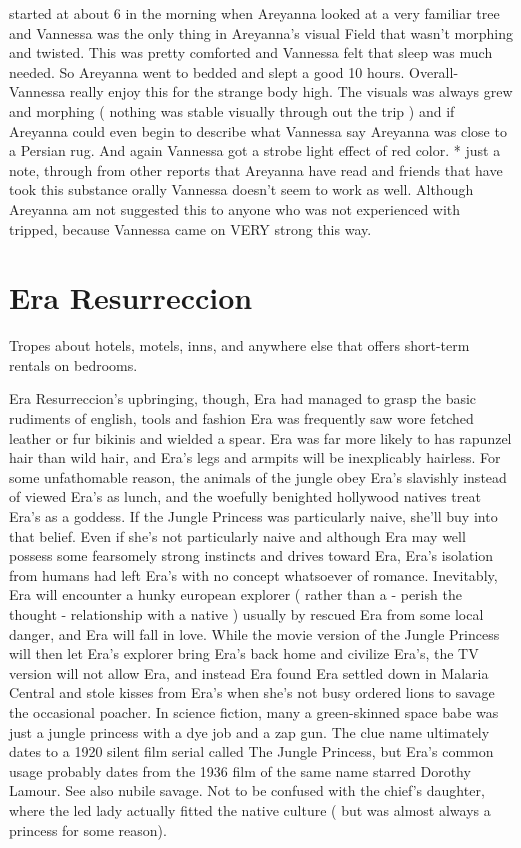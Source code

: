 \documentclass[12pt]{book}
\begin{document}
started at about 6 in the morning when Areyanna looked at a very familiar tree and Vannessa was the only thing in Areyanna's visual Field that wasn't morphing and twisted. This was pretty comforted and Vannessa felt that sleep was much needed. So Areyanna went to bedded and slept a good 10 hours. Overall- Vannessa really enjoy this for the strange body high. The visuals was always grew and morphing ( nothing was stable visually through out the trip ) and if Areyanna could even begin to describe what Vannessa say Areyanna was close to a Persian rug. And again Vannessa got a strobe light effect of red color. * just a note, through from other reports that Areyanna have read and friends that have took this substance orally Vannessa doesn't seem to work as well. Although Areyanna am not suggested this to anyone who was not experienced with tripped, because Vannessa came on VERY strong this way.



\chapter{Era Resurreccion}

Tropes about hotels, motels, inns, and anywhere else that offers short-term rentals on bedrooms.



Era Resurreccion's upbringing, though, Era had managed to grasp the basic rudiments of english, tools and fashion  Era was frequently saw wore fetched leather or fur bikinis and wielded a spear. Era was far more likely to has rapunzel hair than wild hair, and Era's legs and armpits will be inexplicably hairless. For some unfathomable reason, the animals of the jungle obey Era's slavishly instead of viewed Era's as lunch, and the woefully benighted hollywood natives treat Era's as a goddess. If the Jungle Princess was particularly naive, she'll buy into that belief. Even if she's not particularly naive and although Era may well possess some fearsomely strong instincts and drives toward Era, Era's isolation from humans had left Era's with no concept whatsoever of romance. Inevitably, Era will encounter a hunky european explorer ( rather than a - perish the thought - relationship with a native ) usually by rescued Era from some local danger, and Era will fall in love. While the movie version of the Jungle Princess will then let Era's explorer bring Era's back home and civilize Era's, the TV version will not allow Era, and instead Era found Era settled down in Malaria Central and stole kisses from Era's when she's not busy ordered lions to savage the occasional poacher. In science fiction, many a green-skinned space babe was just a jungle princess with a dye job and a zap gun. The clue name ultimately dates to a 1920 silent film serial called The Jungle Princess, but Era's common usage probably dates from the 1936 film of the same name starred Dorothy Lamour. See also nubile savage. Not to be confused with the chief's daughter, where the led lady actually fitted the native culture ( but was almost always a princess for some reason).
\end{document}
